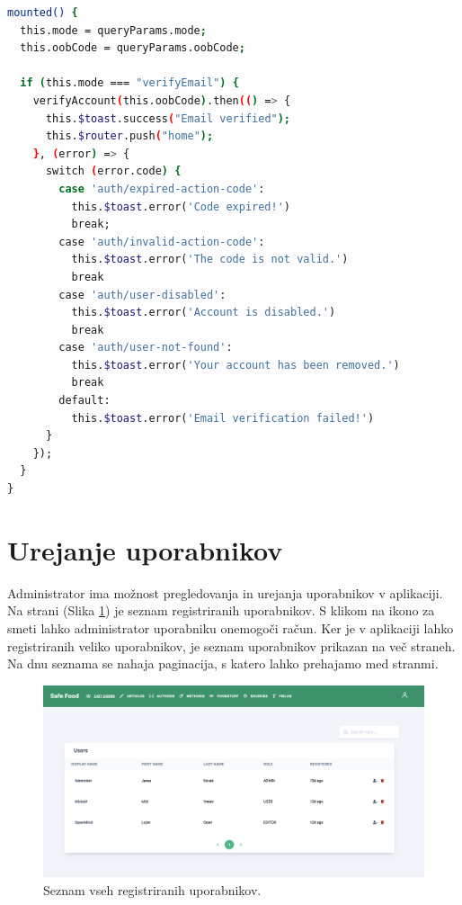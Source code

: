 \documentclass[a4paper, 12pt]{book}
\begin{document}
\begin{lstlisting}[language=bash, style=mystyle,caption={Primer kode, za preverjanje uporabnika.}, label=lst:verify-username]
mounted() {
  this.mode = queryParams.mode;
  this.oobCode = queryParams.oobCode;
    
  if (this.mode === "verifyEmail") {
    verifyAccount(this.oobCode).then(() => {
      this.$toast.success("Email verified");
      this.$router.push("home");
    }, (error) => {
      switch (error.code) {
        case 'auth/expired-action-code':
          this.$toast.error('Code expired!')
          break;
        case 'auth/invalid-action-code':
          this.$toast.error('The code is not valid.')
          break
        case 'auth/user-disabled':
          this.$toast.error('Account is disabled.')
          break
        case 'auth/user-not-found':
          this.$toast.error('Your account has been removed.')
          break
        default:
          this.$toast.error('Email verification failed!')
      }
    });
  }
}
\end{lstlisting}
\clearpage


\section{Urejanje uporabnikov}
\label{administracija-uporabnikov}
Administrator ima možnost pregledovanja in urejanja uporabnikov v aplikaciji. Na strani  (Slika \ref{users-list-page}) je seznam registriranih uporabnikov. S klikom na ikono za smeti lahko administrator uporabniku onemogoči račun. Ker je v aplikaciji lahko registriranih veliko uporabnikov, je seznam uporabnikov prikazan na več straneh. Na dnu seznama se nahaja paginacija, s katero lahko prehajamo med stranmi.

\begin{figure}[h]
\begin{center}
\includegraphics[width=1\textwidth]{slike/users-list.png}
\end{center}
\caption{ Seznam vseh registriranih uporabnikov. }
\label{users-list-page}
\end{figure}
\end{document}
